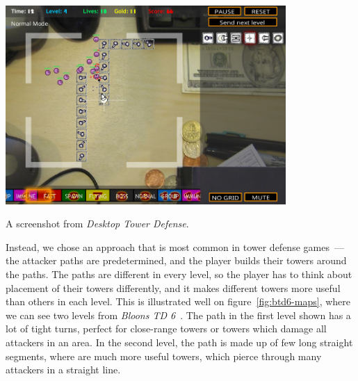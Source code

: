 \begin{center}
    \captionsetup{type=figure}
    \includegraphics[width=0.8\textwidth]{img/Desktop-Tower-Defense-Pathfinding.png}
    \caption{A screenshot from \emph{Desktop Tower Defense}.}
    \label{fig:dtd-pathfinding}
\end{center}

Instead, we chose an approach that is most common in tower defense games~--- the attacker paths are predetermined, and the player builds their towers around the paths.
The paths are different in every level, so the player has to think about placement of their towers differently, and it makes different towers more useful than others in each level.
This is illustrated well on figure~\ref{fig:btd6-maps}, where we can see two levels from \emph{Bloons TD 6}~\cite{BTD6}.
The path in the first level shown has a lot of tight turns, perfect for close-range towers or towers which damage all attackers in an area.
In the second level, the path is made up of few long straight segments, where are much more useful towers, which pierce through many attackers in a straight line.

